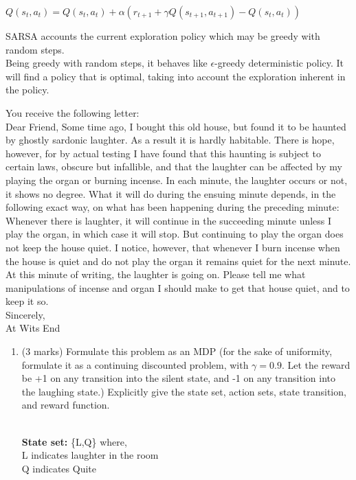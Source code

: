 \documentclass[addpoints,12pt,solution]{exam}
\begin{document}
\begin{questions}
\begin{enumerate}[label=(\alph*)]
\begin{solution}
$Q(s_t,a_t) = Q(s_t,a_t) + \alpha (r_{t+1} + \gamma Q(s_{t+1},a_{t+1}) - Q(s_t,a_t))$

SARSA accounts the current exploration policy which may be greedy with random steps.\\
Being greedy with random steps, it behaves like $\epsilon$-greedy deterministic policy. It will find a policy that is optimal, taking into account the exploration inherent in the policy. 
\end{solution}

\end{enumerate}

\question[7]You receive the following letter:\\
Dear Friend, Some time ago, I bought this old house, but found it to be haunted by
ghostly sardonic laughter. As a result it is hardly habitable. There is hope, however,
for by actual testing I have found that this haunting is subject to certain laws, obscure
but infallible, and that the laughter can be affected by my playing the organ or burning
incense. In each minute, the laughter occurs or not, it shows no degree. What it will
do during the ensuing minute depends, in the following exact way, on what has been
happening during the preceding minute: Whenever there is laughter, it will continue in
the succeeding minute unless I play the organ, in which case it will stop. But continuing
to play the organ does not keep the house quiet. I notice, however, that whenever I
burn incense when the house is quiet and do not play the organ it remains quiet for the
next minute. At this minute of writing, the laughter is going on. Please tell me what
manipulations of incense and organ I should make to get that house quiet, and to keep
it so.\\
Sincerely,\\
At Wits End
\begin{enumerate}[label=(\alph*)]
    \item (3 marks) Formulate this problem as an MDP (for the sake of uniformity, formulate it as a
continuing discounted problem, with $\gamma= 0.9$. Let the reward be +1 on any transition
into the silent state, and -1 on any transition into the laughing state.) Explicitly give the
state set, action sets, state transition, and reward function.
\begin{solution}
\\
\textbf{State set: } \{L,Q\} 
where,\\
L indicates laughter in the room \\
Q indicates Quite \\


\end{solution}
\end{enumerate}
\end{questions}
\end{document}
